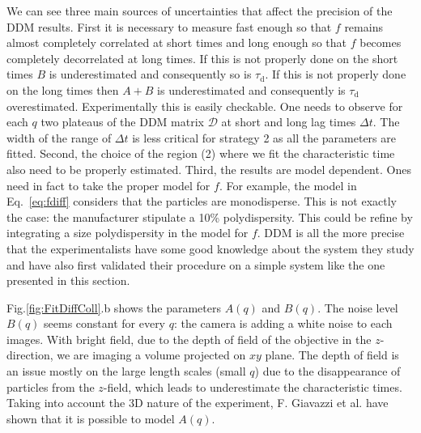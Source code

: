 \documentclass[prb,twocolumn,amsmath,amssymb]{revtex4-1}
\newcommand{\tgn}[1]{{\color{blue}#1}} %
\begin{document}
We can see three main sources of uncertainties that affect the precision of the DDM results. First it is necessary to measure fast enough so that $f$ remains almost completely correlated at short times and long enough so that $f$ becomes completely decorrelated at long times. If this is not properly done on the short times $B$ is underestimated and consequently so is $\tau_\text{d}$. If this is not properly done on the long times then  $A+B$ is underestimated and consequently is $\tau_\text{d}$ overestimated. Experimentally this is easily checkable. One needs to observe for each $q$ two plateaus of the DDM matrix $\mathcal{D}$ at short and long lag times $\Delta t$. The width of the range of $\Delta t$ is less critical for strategy 2 as all the parameters are fitted. Second, the choice of the region (2) where we fit the characteristic time also need to be properly estimated. Third, the results are model dependent. Ones need in fact to take the proper model for $f$. For example, the model in Eq.~\eqref{eq:fdiff}  considers that the particles are monodisperse. This is not exactly the case: the manufacturer stipulate a 10\% polydispersity. This could be refine by integrating a size polydispersity \tgn{in the model for $f$}. DDM is all the more precise that the experimentalists have some good knowledge about the system they study and have also first validated their procedure on a simple system like the one presented in this section.



 Fig.\ref{fig:FitDiffColl}.b shows the parameters $A(q)$ and $B(q)$. The noise level $B(q)$ seems constant for every $q$: the camera is adding a white noise to each images. With bright field, due to the depth of field of the objective in the $z$-direction, we are imaging a volume projected on $xy$ plane. The depth of field is an issue mostly on the large length scales (small $q$) due to the disappearance of particles from the $z$-field, which leads to underestimate the characteristic times\cite {4_Martinez20121637}. Taking into account the 3D nature of the experiment,  F. Giavazzi et al.\citep{3_DDM3D} have shown that it is possible to model $A(q)$.
\end{document}
